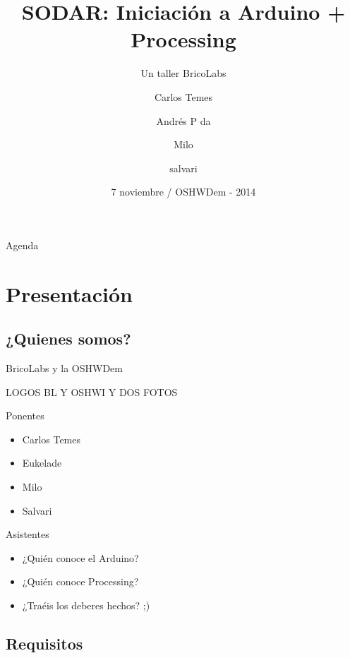 \documentclass{beamer}
\title[Taller SODAR] %
{SODAR: Iniciación a Arduino + Processing}
\subtitle
{Un taller BricoLabs} %
\author[ctemes, eukelade, milo, salvari] %
{Carlos Temes \and Andrés P da \and Milo \and salvari}
\institute[BricoLabs] %
{
Asociación BricoLabs 
}
\date[Short Occasion] %
{7 noviembre / OSHWDem - 2014}
\begin{document}
\begin{frame}
  \titlepage
\end{frame}

\begin{frame}{Agenda}
  \tableofcontents
\end{frame}




\section{Presentación}
\subsection{¿Quienes somos?}

\begin{frame}{BricoLabs y la OSHWDem}

LOGOS BL Y OSHWI Y DOS FOTOS   
\end{frame}


\begin{frame}{Ponentes}
  \begin{itemize}
  \item Carlos Temes
  \item Eukelade
  \item Milo
  \item Salvari
  \end{itemize}
\end{frame}

\begin{frame}{Asistentes}
  \begin{itemize}
  \item ¿Quién conoce el Arduino?
    \pause
  \item ¿Quién conoce Processing?
    \pause
  \item ¿Traéis los deberes hechos? ;)
  \end{itemize}
\end{frame}

\subsection{Requisitos}
\end{document}
